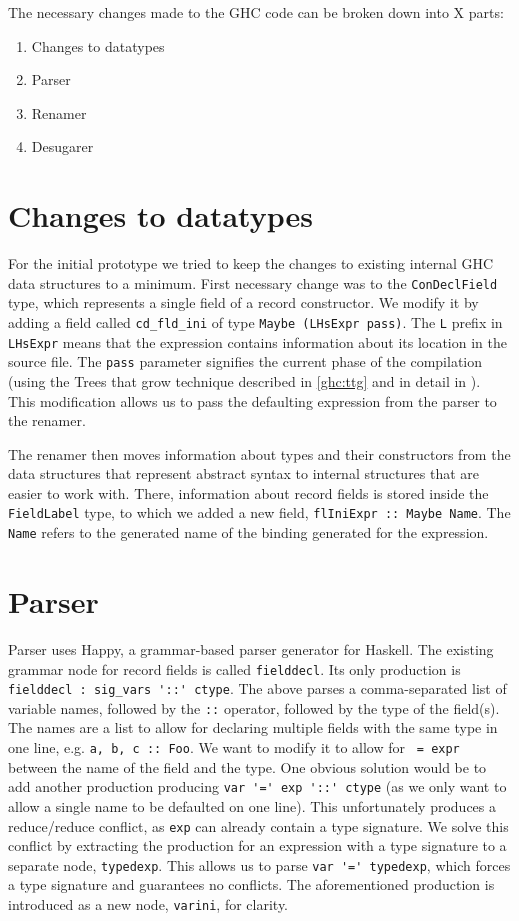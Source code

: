 \documentclass[en]{pracamgr}
\newcommand{\code}[1]{\lstinline[breaklines=true]{#1}}
\begin{document}
The necessary changes made to the GHC code can be broken down into X parts:
\begin{enumerate}
  \item Changes to datatypes
  \item Parser
  \item Renamer
  \item Desugarer
\end{enumerate}

\section{Changes to datatypes} 

For the initial prototype we tried to keep the changes to existing internal GHC data structures to a minimum.
First necessary change was to the \code{ConDeclField} type, which represents a single field of a record constructor.
We modify it by adding a field called \code{cd_fld_ini} of type \code{Maybe (LHsExpr pass)}. 
The \code{L} prefix in \code{LHsExpr} means that the expression contains information about its location in the source file.
The \code{pass} parameter signifies the current phase of the compilation (using the Trees that grow technique described in \ref{ghc:ttg} and in detail in \cite{Najd2017TreesTG}).
This modification allows us to pass the defaulting expression from the parser to the renamer.

The renamer then moves information about types and their constructors from the data structures that represent abstract syntax to internal structures that are easier to work with.
There, information about record fields is stored inside the \code{FieldLabel} type, to which we added a new field, \code{flIniExpr :: Maybe Name}.
The \code{Name} refers to the generated name of the binding generated for the expression.

\section{Parser}\label{impl:parser}
Parser uses Happy, a grammar-based parser generator for Haskell.
The existing grammar node for record fields is called \code{fielddecl}.
Its only production is \lstinline[breaklines=true]{fielddecl : sig_vars '::' ctype}.
The above parses a comma-separated list of variable names, followed by the \code{::} operator, followed by the type of the field(s).
The names are a list to allow for declaring multiple fields with the same type in one line, e.g. \code{a, b, c :: Foo}.
We want to modify it to allow for \code{ = expr} between the name of the field and the type.
One obvious solution would be to add another production producing \code{var '=' exp '::' ctype} (as we only want to allow a single name to be defaulted on one line).
This unfortunately produces a reduce/reduce conflict, as \code{exp} can already contain a type signature. 
We solve this conflict by extracting the production for an expression with a type signature to a separate node, \code{typedexp}.
This allows us to parse \code{var '=' typedexp}, which forces a type signature and guarantees no conflicts.
The aforementioned production is introduced as a new node, \code{varini}, for clarity.
\end{document}

